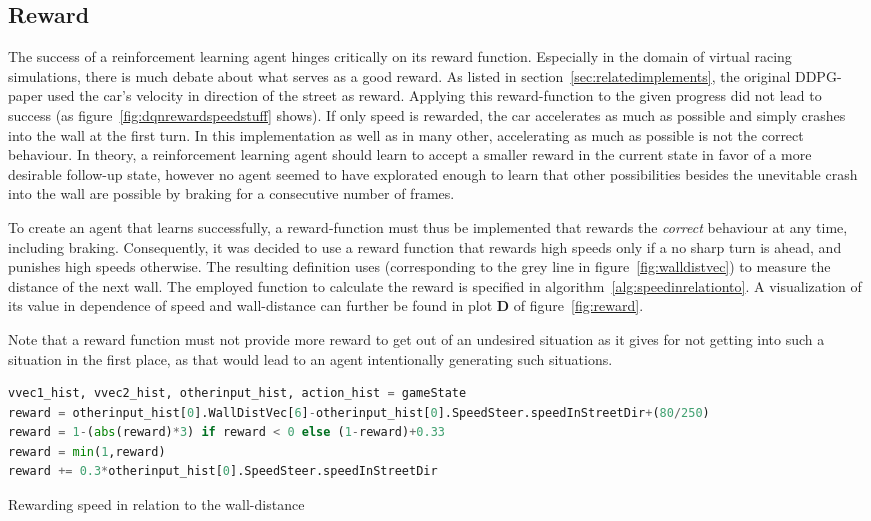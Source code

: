 \subsection{Reward}
		
\label{sec:reward}		
		
The success of a reinforcement learning agent hinges critically on its reward function. Especially in the domain of virtual racing simulations, there is much debate about what serves as a good reward. As listed in section~\ref{sec:relatedimplements}, the original DDPG-paper \cite{lillicrap_continuous_2015} used the car's velocity in direction of the street as reward. Applying this reward-function to the given progress did not lead to success (as figure~\ref{fig:dqnrewardspeedstuff} shows). If only speed is rewarded, the car accelerates as much as possible and simply crashes into the wall at the first turn. In this implementation as well as in many other, accelerating as much as possible is not the correct behaviour. In theory, a reinforcement learning agent should learn to accept a smaller reward in the current state in favor of a more desirable follow-up state, however no agent seemed to have explorated enough to learn that other possibilities besides the unevitable crash into the wall are possible by braking for a consecutive number of frames. 

To create an agent that learns successfully, a reward-function must thus be implemented that rewards the \textit{correct} behaviour at any time, including braking. Consequently, it was decided to use a reward function that rewards high speeds only if a no sharp turn is ahead, and punishes high speeds otherwise. The resulting definition uses  (corresponding to the grey line in figure~\ref{fig:walldistvec}) to measure the distance of the next wall. The employed function to calculate the reward is specified in algorithm~\ref{alg:speedinrelationto}. A visualization of its value in dependence of speed and wall-distance can further be found in plot \textbf{D} of figure~\ref{fig:reward}.

Note that a reward function must not provide more reward to get out of an undesired situation as it gives for not getting into such a situation in the first place, as that would lead to an agent intentionally generating such situations.

\begin{algorithm}[h]
	\begin{lstlisting}[language=Python, style=Python, frame=none]
vvec1_hist, vvec2_hist, otherinput_hist, action_hist = gameState
reward = otherinput_hist[0].WallDistVec[6]-otherinput_hist[0].SpeedSteer.speedInStreetDir+(80/250)
reward = 1-(abs(reward)*3) if reward < 0 else (1-reward)+0.33
reward = min(1,reward)
reward += 0.3*otherinput_hist[0].SpeedSteer.speedInStreetDir
	\end{lstlisting}%
	\caption{Rewarding speed in relation to the wall-distance}
	\label{alg:speedinrelationto}
\end{algorithm}

